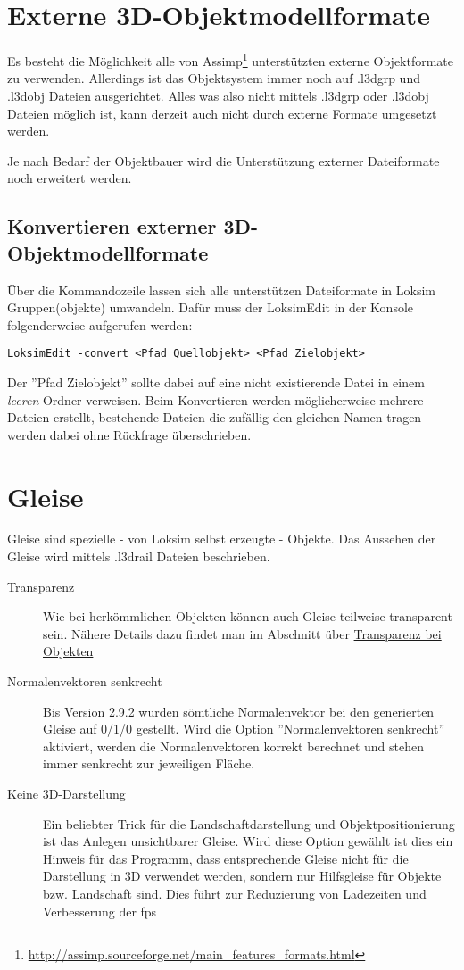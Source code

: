\section{Externe 3D-Objektmodellformate}
\label{sec:editor-obj-externe}
Es besteht die Möglichkeit alle von Assimp\footnote{\url{http://assimp.sourceforge.net/main_features_formats.html}} unterstützten externe Objektformate zu verwenden. Allerdings ist das Objektsystem immer noch auf .l3dgrp und .l3dobj Dateien ausgerichtet. Alles was also nicht mittels .l3dgrp oder .l3dobj Dateien möglich ist, kann derzeit auch nicht durch externe Formate umgesetzt werden.

Je nach Bedarf der Objektbauer wird die Unterstützung externer Dateiformate noch erweitert werden.

\subsection{Konvertieren externer 3D-Objektmodellformate}
\label{sec:editor-obj-externe-konvertieren}
Über die Kommandozeile lassen sich alle unterstützen Dateiformate in Loksim Gruppen(objekte) umwandeln. Dafür muss der LoksimEdit in der Konsole folgenderweise aufgerufen werden:
\begin{verbatim}
LoksimEdit -convert <Pfad Quellobjekt> <Pfad Zielobjekt>
\end{verbatim}
Der ''Pfad Zielobjekt'' sollte dabei auf eine nicht existierende Datei in einem \emph{leeren} Ordner verweisen. Beim Konvertieren werden möglicherweise mehrere Dateien erstellt, bestehende Dateien die zufällig den gleichen Namen tragen werden dabei ohne Rückfrage überschrieben.

\section{Gleise}
\label{sec:editor-gleise}
Gleise sind spezielle - von Loksim selbst erzeugte - Objekte. Das Aussehen der Gleise wird mittels .l3drail Dateien beschrieben.

\begin{description}
\item[Transparenz] Wie bei herkömmlichen Objekten können auch Gleise teilweise transparent sein. Nähere Details dazu findet man im Abschnitt über \hyperref[sec:editor-obj-transparenz]{Transparenz bei Objekten}
\item[Normalenvektoren senkrecht] Bis Version 2.9.2 wurden sömtliche Normalenvektor bei den generierten Gleise auf 0/1/0 gestellt. Wird die Option ''Normalenvektoren senkrecht'' aktiviert, werden die Normalenvektoren korrekt berechnet und stehen immer senkrecht zur jeweiligen Fläche.
\item[Keine 3D-Darstellung] Ein beliebter Trick für die Landschaftdarstellung und Objektpositionierung ist das Anlegen unsichtbarer Gleise. Wird diese Option gewählt ist dies ein Hinweis für das Programm, dass entsprechende Gleise nicht für die Darstellung in 3D verwendet werden, sondern nur Hilfsgleise für Objekte bzw. Landschaft sind. Dies führt zur Reduzierung von Ladezeiten und Verbesserung der fps
\end{description}
